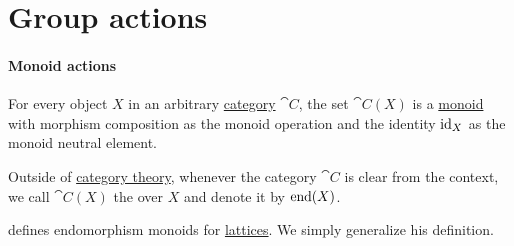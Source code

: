 \section{Group actions}\label{sec:group_actions}

\paragraph{Monoid actions}

\begin{definition}\label{def:endomorphism_monoid}\mimprovised
  For every object \( X \) in an arbitrary \hyperref[def:category]{category} \( \cat{C} \), the set \( \cat{C}(X) \) is a \hyperref[def:monoid]{monoid} with morphism composition as the monoid operation and the identity \( \operatorname{id}_X \) as the monoid neutral element.

  Outside of \hyperref[ch:category_theory]{category theory}, whenever the category \( \cat{C} \) is clear from the context, we call \( \cat{C}(X) \) the  over \( X \) and denote it by \( \operatorname{end}(X) \).
\end{definition}
\begin{comments}
  \item {} defines endomorphism monoids for \hyperref[def:lattice]{lattices}. We simply generalize his definition.
\end{comments}

